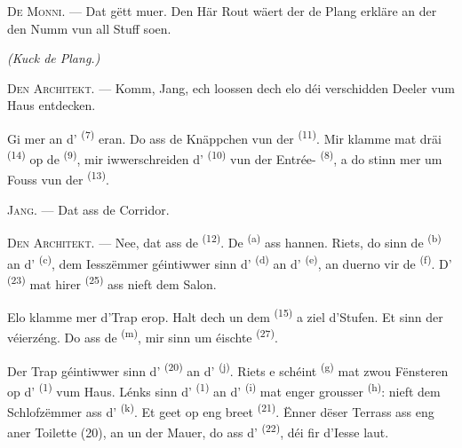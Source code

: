 \textsc{De Monni}. --- Dat gëtt muer. Den Här Rout wäert der de Plang erkläre an der
den Numm vun all Stuff soen.

\VUsaut{3.0mm}
\VUsaut{2.4mm}

{\centering\textit{(Kuck de Plang.)}\par}
\VUsaut{2.4mm}

\textsc{Den Architekt}. --- Komm, Jang, ech loossen dech elo déi verschidden Deeler
vum Haus entdecken.

Gi mer an d' \textsuperscript{(7)} eran. Do ass de Knäppchen vun
der  \textsuperscript{(11)}. Mir klamme mat dräi 
\textsuperscript{(14)} op de  \textsuperscript{(9)}, mir iwwerschreiden
d' \textsuperscript{(10)} vun der Entrée-
\textsuperscript{(8)}, a do stinn mer um Fouss vun der 
\textsuperscript{(13)}.

\textsc{Jang}. --- Dat ass de Corridor.

\textsc{Den Architekt}. --- Nee, dat ass de 
\textsuperscript{(12)}. De  \textsuperscript{(a)} ass hannen. Riets,
do sinn de  \textsuperscript{(b)} an d'
\textsuperscript{(c)}, dem Iesszëmmer géintiwwer sinn d'
\textsuperscript{(d)} an d' \textsuperscript{(e)}, an duerno vir de
 \textsuperscript{(f)}. D' \textsuperscript{(23)} mat
hirer  \textsuperscript{(25)} ass nieft dem Salon.

Elo klamme mer d'Trap erop. Halt dech un dem 
\textsuperscript{(15)} a ziel d'Stufen. Et sinn der véierzéng. Do ass de
 \textsuperscript{(m)}, mir sinn um éischte 
\textsuperscript{(27)}.

\VUsaut{3.0mm}
\VUsaut{3.0mm}

Der Trap géintiwwer sinn d' \textsuperscript{(20)} an
d' \textsuperscript{(j)}. Riets e schéint 
\textsuperscript{(g)} mat zwou Fënsteren op d' \textsuperscript{(1)}
vum Haus. Lénks sinn d' \textsuperscript{(1)} an
d' \textsuperscript{(i)} mat enger grousser 
\textsuperscript{(h)}: nieft dem Schlofzëmmer ass d'
\textsuperscript{(k)}. Et geet op eng breet  \textsuperscript{(21)}.
Ënner dëser Terrass ass eng aner Toilette (20), an un der Mauer, do ass
d' \textsuperscript{(22)}, déi fir d'Iesse laut.

